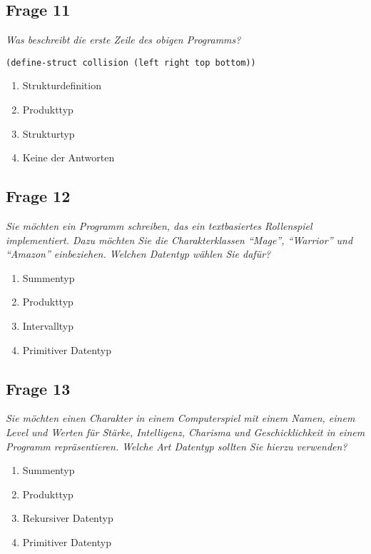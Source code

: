 \documentclass[a4paper, 11pt]{article}
\begin{document}
\begin{mdframed}
	\subsection*{Frage 11}
	\textit{Was beschreibt die erste Zeile des obigen Programms?}
	\begin{verbatim}
(define-struct collision (left right top bottom))
\end{verbatim}
	\begin{enumerate}[label=$\square$]
		\item Strukturdefinition
		\item Produkttyp
		\item Strukturtyp
		\item Keine der Antworten
	\end{enumerate}
\end{mdframed}

\subsection*{Frage 12}
\textit{Sie möchten ein Programm schreiben, das ein textbasiertes Rollenspiel implementiert. Dazu möchten Sie die Charakterklassen \enquote{Mage}, \enquote{Warrior} und \enquote{Amazon} einbeziehen. Welchen Datentyp wählen Sie dafür?}
\begin{enumerate}[label=$\square$]
	\item Summentyp
	\item Produkttyp
	\item Intervalltyp
	\item Primitiver Datentyp
\end{enumerate}

\subsection*{Frage 13}
\textit{Sie möchten einen Charakter in einem Computerspiel mit einem Namen, einem Level und Werten für Stärke, Intelligenz, Charisma und Geschicklichkeit in einem Programm repräsentieren. Welche Art Datentyp sollten Sie hierzu verwenden?}
\begin{enumerate}[label=$\square$]
	\item Summentyp
	\item Produkttyp
	\item Rekursiver Datentyp
	\item Primitiver Datentyp
\end{enumerate}
\end{document}
